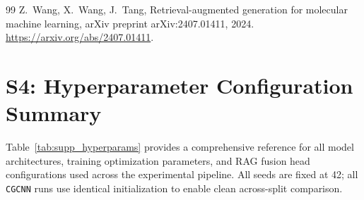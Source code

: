 \documentclass[preprint,12pt]{elsarticle}
\newcommand{\cgcnn}{\texttt{CGCNN}}
\begin{document}
\begin{thebibliography}{99}
Z.~Wang, X.~Wang, J.~Tang,
\newblock Retrieval-augmented generation for molecular machine learning,
\newblock arXiv preprint arXiv:2407.01411, 2024.
\newblock \url{https://arxiv.org/abs/2407.01411}.

\section*{S4: Hyperparameter Configuration Summary}
\label{supp:s4}

Table~\ref{tab:supp_hyperparams} provides a comprehensive reference for all model
architectures, training optimization parameters, and RAG fusion head configurations
used across the experimental pipeline. All seeds are fixed at 42; all \cgcnn{} runs
use identical initialization to enable clean across-split comparison.


\end{thebibliography}
\end{document}
